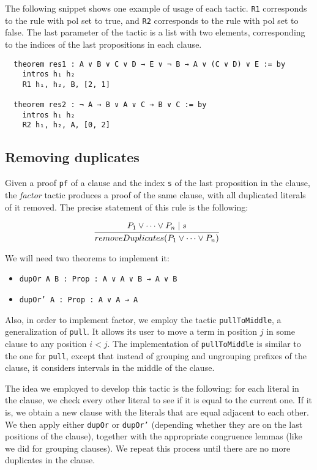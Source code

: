 The following snippet shows one example of usage of each tactic. \texttt{R1} corresponds to
the rule with pol set to true, and \texttt{R2} corresponds to the rule with pol set to false.
The last parameter of the tactic is a list with two elements, corresponding to the indices
of the last propositions in each clause.

\begin{verbatim}
  theorem res1 : A ∨ B ∨ C ∨ D → E ∨ ¬ B → A ∨ (C ∨ D) ∨ E := by
    intros h₁ h₂
    R1 h₁, h₂, B, [2, 1]

  theorem res2 : ¬ A → B ∨ A ∨ C → B ∨ C := by
    intros h₁ h₂
    R2 h₁, h₂, A, [0, 2]
\end{verbatim}

\subsection*{Removing duplicates}

Given a proof \texttt{pf} of a clause and the index \texttt{s} of the last proposition in the clause,
the \textit{factor} tactic produces a proof of the same clause, with all duplicated literals of it removed. The precise statement of this rule is the following:

\[
  \infer[]{removeDuplicates(P_{1} \vee \cdots \vee P_{n})}{P_{1} \vee \cdots \vee P_{n} \mid s}
\]

We will need two theorems to implement it:

\begin{itemize}
  \item \texttt{dupOr {A B : Prop} : A ∨ A ∨ B → A ∨ B}
  \item \texttt{dupOr' {A : Prop} : A ∨ A → A}
\end{itemize}

Also, in order to implement factor, we employ the tactic \texttt{pullToMiddle},
a generalization of \texttt{pull}. It allows its user to move a term in position $j$ in some clause to any position
$i < j$. The implementation of \texttt{pullToMiddle} is similar to the one for \texttt{pull}, except
that instead of grouping and ungrouping prefixes of the clause, it considers intervals in the middle of the clause.

The idea we employed to develop this tactic is the following: for each literal in the clause, we
check every other literal to see if it is equal to the current one. If it is, we obtain a new
clause with the literals that are equal adjacent to each other. We then apply either \texttt{dupOr}
or \texttt{dupOr'} (depending whether they are on the last positions of the clause), together
with the appropriate congruence lemmas (like we did for grouping clauses). We repeat this process
until there are no more duplicates in the clause.


